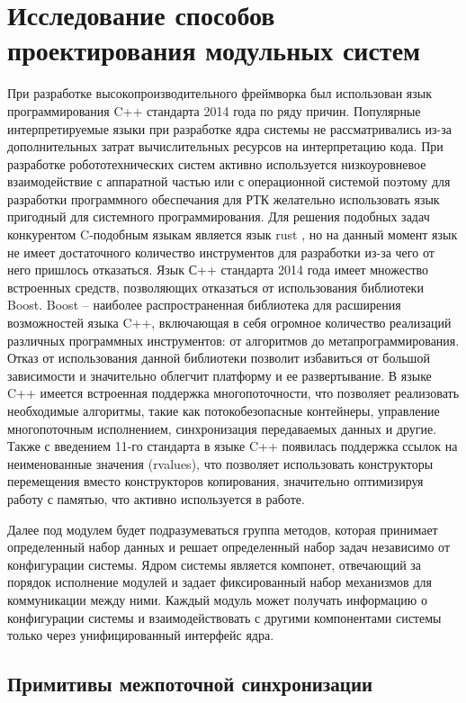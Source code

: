 \section{Исследование способов проектирования модульных систем}

При разработке высокопроизводительного фреймворка был использован язык 
программирования C++ стандарта 2014 года по ряду причин. Популярные 
интерпретируемые языки при разработке ядра системы не рассматривались из-за 
дополнительных затрат вычислительных ресурсов на интерпретацию кода. При 
разработке робототехнических систем активно используется низкоуровневое 
взаимодействие с аппаратной частью или с операционной системой поэтому для 
разработки программного обеспечания для РТК желательно использовать язык 
пригодный для системного программирования. Для решения подобных задач 
конкурентом C-подобным языкам является язык rust \cite{matsakis2014rust}, но на 
данный момент язык не имеет достаточного количество инструментов для разработки 
из-за чего от него пришлось отказаться. Язык С++ стандарта 2014 года имеет 
множество встроенных средств, позволяющих отказаться от использования 
библиотеки Boost. Boost – наиболее распространенная библиотека для расширения 
возможностей языка C++, включающая в себя огромное количество реализаций 
различных программных инструментов: от алгоритмов до метапрограммирования. 
Отказ от использования данной библиотеки позволит избавиться от большой 
зависимости и значительно облегчит платформу и ее развертывание. В языке C++ 
имеется встроенная поддержка многопоточности, что позволяет реализовать 
необходимые алгоритмы, такие как потокобезопасные контейнеры, управление 
многопоточным исполнением, синхронизация передаваемых данных и другие. Также с 
введением 11-го стандарта в языке C++ появилась поддержка ссылок на 
неименованные значения (rvalues), что позволяет использовать конструкторы 
перемещения вместо конструкторов копирования, значительно оптимизируя работу с 
памятью, что активно используется в работе.

Далее под модулем будет подразумеваться группа методов, которая принимает определенный набор данных и решает определенный набор задач независимо от конфигурации системы. Ядром системы является компонет, отвечающий за порядок исполнение модулей и задает фиксированный набор механизмов для коммуникации между ними. Каждый модуль может получать информацию о конфигурации системы и взаимодействовать с другими компонентами системы только через унифицированный интерфейс ядра.

\subsection{Примитивы межпоточной синхронизации}


